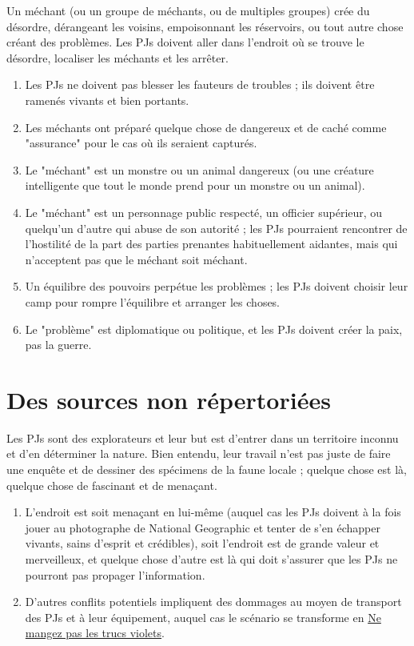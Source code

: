 \begin{multicols}{2}

Un méchant (ou un groupe de méchants, ou de multiples groupes) crée du désordre, dérangeant les voisins, empoisonnant les réservoirs, ou tout autre chose créant des problèmes. Les PJs doivent aller dans l'endroit où se trouve le désordre, localiser les méchants et les arrêter.

\themes
\begin{enumerate}
\item Les PJs ne doivent pas blesser les fauteurs de troubles ; ils doivent être ramenés vivants et bien portants.
\item Les méchants ont préparé quelque chose de dangereux et de caché comme "assurance" pour le cas où ils seraient capturés.
\item Le "méchant" est un monstre ou un animal dangereux (ou une créature intelligente que tout le monde prend pour un monstre ou un animal).
\item Le "méchant" est un personnage public respecté, un officier supérieur, ou quelqu'un d'autre qui abuse de son autorité ; les PJs pourraient rencontrer de l'hostilité de la part des parties prenantes habituellement aidantes, mais qui n'acceptent pas que le méchant soit méchant.
\item Un équilibre des pouvoirs perpétue les problèmes ; les PJs doivent choisir leur camp pour rompre l'équilibre et arranger les choses.
\item Le "problème" est diplomatique ou politique, et les PJs doivent créer la paix, pas la guerre.
\end{enumerate}

\section{Des sources non répertoriées}
\label{sources}


Les PJs sont des explorateurs et leur but est d'entrer dans un territoire inconnu et d'en déterminer la nature. Bien entendu, leur travail n'est pas juste de faire une enquête et de dessiner des spécimens de la faune locale ; quelque chose est là, quelque chose de fascinant et de menaçant.

\themes
\begin{enumerate}
\item L'endroit est soit menaçant en lui-même (auquel cas les PJs doivent à la fois jouer au photographe de National Geographic et tenter de s'en échapper vivants, sains d'esprit et crédibles), soit l'endroit est de grande valeur et merveilleux, et quelque chose d'autre est là qui doit s'assurer que les PJs ne pourront pas propager l'information.
\item D'autres conflits potentiels impliquent des dommages au moyen de transport des PJs et à leur équipement, auquel cas le scénario se transforme en \hyperref[violet]{Ne mangez pas les trucs violets}.
\end{enumerate}


\end{multicols}
